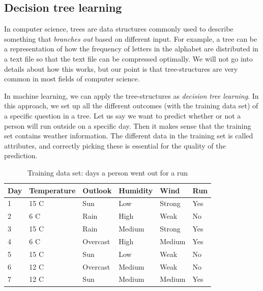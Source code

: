 \subsection{Decision tree learning}
In computer science, trees are data structures commonly used to describe something that \textit{branches out} based on different input. For example, 
a tree can be a representation of how the frequency of letters in the alphabet are distributed in a text file so that the text file can be compressed optimally. 
We will not go into details about how this works, but our point is that tree-structures are very common in most fields of computer science. 

In machine learning, we can apply the tree-structures as \textit{decision tree learning}. In this approach, we set up all the different outcomes 
(with the training data set) of a specific question in a tree. Let us say we want to predict whether or not a person will run outside on a specific day. 
Then it makes sense that the training set contains weather information. The different data in the training set is called attributes, and correctly picking 
these is essential for the quality of the prediction.

\begin{table}
    \begin{tabular}{| l | l | l | l | l | l |}
    \hline
    \textbf{Day} & \textbf{Temperature} & \textbf{Outlook}   & \textbf{Humidity}  & \textbf{Wind}     & \textbf{Run} \\ \hline
            1    & 15 C                 & Sun                & Low                & Strong            & Yes \\
            2    & 6 C                  & Rain               & High               & Weak              & No  \\
            3    & 15 C                 & Rain               & Medium             & Strong            & Yes \\
            4    & 6 C                  & Overcast           & High               & Medium            & Yes \\
            5    & 15 C                 & Sun                & Low                & Weak              & No  \\
            6    & 12 C                 & Overcast           & Medium             & Weak              & No  \\
            7    & 12 C                 & Sun                & Medium             & Medium            & Yes \\
    \hline
    \end{tabular}
    \caption{Training data set: days a person went out for a run}
    \label{table:days_running}
\end{table}

